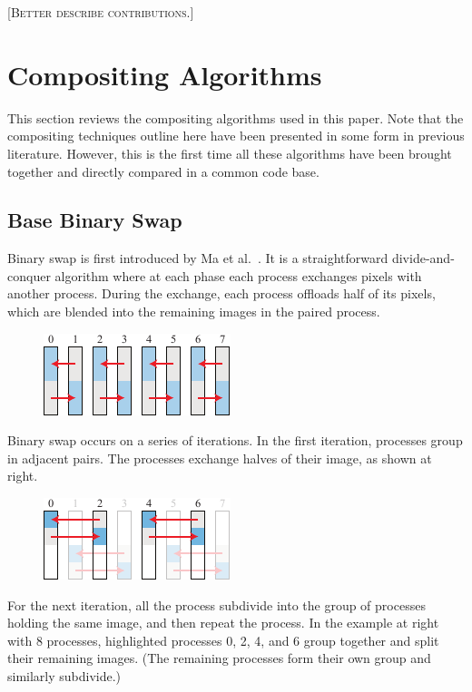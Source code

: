 \documentclass{vgtc}                          %
\newcommand*{\scite}[1]{~\cite{#1}}
\newcommand{\etal}{et al.\xspace}
\newcommand{\fix}[1]{{\color{red}\textsc{[#1]}}}
\begin{document}
\fix{Better describe contributions.}

\section{Compositing Algorithms}

This section reviews the compositing algorithms used in this paper.
Note that the compositing techniques outline here have been presented in some form in previous literature.
However, this is the first time all these algorithms have been brought together and directly compared in a common code base.

\setlength{\intextsep}{0pt}
\setlength{\columnsep}{2ex}

\subsection{Base Binary Swap}
\label{sec:BinarySwap}

Binary swap is first introduced by Ma \etal\scite{BinarySwap}.
It is a straightforward divide-and-conquer algorithm where at each phase each process exchanges pixels with another process.
During the exchange, each process offloads half of its pixels, which are blended into the remaining images in the paired process.

\begin{figure}
  \includegraphics[scale=.75]{binary-swap-1}
\end{figure}
Binary swap occurs on a series of iterations.
In the first iteration, processes group in adjacent pairs.
The processes exchange halves of their image, as shown at right.

\begin{figure}
  \includegraphics[scale=.75]{binary-swap-2}
\end{figure}
For the next iteration, all the process subdivide into the group of processes holding the same image, and then repeat the process.
In the example at right with 8 processes, highlighted processes 0, 2, 4, and 6 group together and split their remaining images.
(The remaining processes form their own group and similarly subdivide.)
\end{document}
